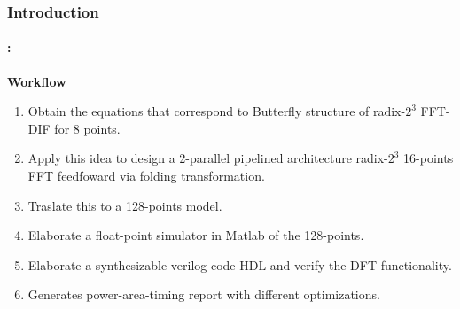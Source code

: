 \begin{frame}
	\frametitle{\textbf{Introduction}}
	\framesubtitle{\secname : \subsecname}
	\begin{block}{\centering \textbf{Workflow}}
		\begin{enumerate}
			\item Obtain the equations that correspond to Butterfly structure of radix-$2^3$ FFT-DIF for 8 points.
			\item Apply this idea to design a 2-parallel pipelined architecture radix-$2^3$ 16-points FFT feedfoward via folding transformation.
			\item Traslate this to a 128-points model.
			\item Elaborate a float-point simulator in Matlab of the 128-points.
			\item Elaborate a synthesizable verilog code HDL and verify the DFT functionality.
			\item Generates power-area-timing report with different optimizations.
		\end{enumerate}
    \end{block}
\end{frame}


